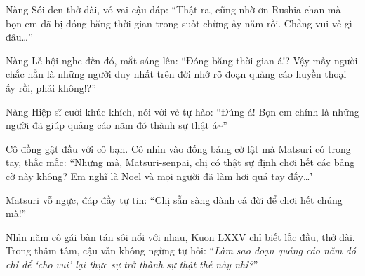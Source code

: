 \documentclass[../main.tex]{subfiles}
\begin{document}
Nàng Sói đen thở dài, vỗ vai cậu đáp: ``Thật ra, cũng nhờ ơn Rushia-chan mà bọn em đã bị đóng băng thời gian trong suốt chừng ấy năm rồi. Chẳng vui vẻ gì đâu\dots''

Nàng Lễ hội nghe đến đó, mắt sáng lên: ``Đóng băng thời gian á!? Vậy mấy người chắc hẳn là những người duy nhất trên đời nhớ rõ đoạn quảng cáo huyền thoại ấy rồi, phải không!?''

Nàng Hiệp sĩ cười khúc khích, nói với vẻ tự hào: ``Đúng á! Bọn em chính là những người đã giúp quảng cáo năm đó thành sự thật á\~{}''

Cô đồng gật đầu với cô bạn. Cô nhìn vào đống bảng cờ lật mà Matsuri có trong tay, thắc mắc: ``Nhưng mà, Matsuri-senpai, chị có thật sự định chơi hết các bảng cờ này không? Em nghĩ là Noel và mọi người đã làm hơi quá tay đấy\dots\''

Matsuri vỗ ngực, đáp đầy tự tin: ``Chị sẵn sàng dành cả đời để chơi hết chúng mà!''

Nhìn năm cô gái bàn tán sôi nổi với nhau, Kuon LXXV chỉ biết lắc đầu, thở dài. Trong thâm tâm, cậu vẫn không ngừng tự hỏi: ``\textit{Làm sao đoạn quảng cáo năm đó chỉ để `cho vui' lại thực sự trở thành sự thật thế này nhỉ?}''
\end{document}
